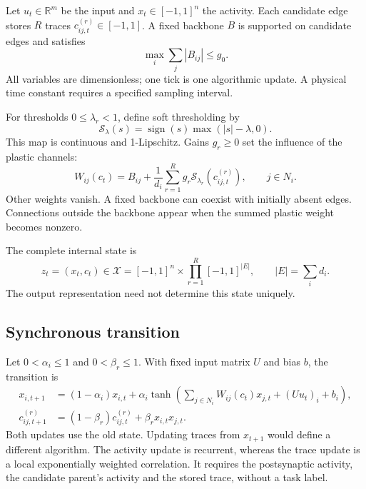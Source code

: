 \documentclass[11pt,a4paper]{article}
\theoremstyle{definition}\newtheorem{definition}[theorem]{Definition}
\newcommand{\R}{\mathbb{R}}
\newcommand{\soft}{\mathcal{S}}
\newcommand{\state}{\mathcal{X}}
\begin{document}
Let $u_t\in\R^m$ be the input and $x_t\in[-1,1]^n$ the activity. Each candidate edge stores $R$ traces $c^{(r)}_{ij,t}\in[-1,1]$. A fixed backbone $B$ is supported on candidate edges and satisfies
\begin{equation}
 \max_i\sum_j|B_{ij}|\leq g_0. \label{eq:backbone}
\end{equation}
All variables are dimensionless; one tick is one algorithmic update. A physical time constant requires a specified sampling interval.

For thresholds $0\leq\lambda_r<1$, define soft thresholding by
\begin{equation}
 \soft_{\lambda}(s)=\operatorname{sign}(s)\max(|s|-\lambda,0).
 \label{eq:soft}
\end{equation}
This map is continuous and 1-Lipschitz. Gains $g_r\geq0$ set the influence of the plastic channels:
\begin{equation}
 W_{ij}(c_t)=B_{ij}+\frac1{d_i}\sum_{r=1}^R g_r\soft_{\lambda_r}(c^{(r)}_{ij,t}),\qquad j\in N_i.
 \label{eq:weights}
\end{equation}
Other weights vanish. A fixed backbone can coexist with initially absent edges. Connections outside the backbone appear when the summed plastic weight becomes nonzero.

The complete internal state is
\begin{equation}
 z_t=(x_t,c_t)\in\state=[-1,1]^n\times\prod_{r=1}^R[-1,1]^{|E|},
 \qquad |E|=\sum_i d_i. \label{eq:state}
\end{equation}
The output representation need not determine this state uniquely.

\subsection{Synchronous transition}
Let $0<\alpha_i\leq1$ and $0<\beta_r\leq1$. With fixed input matrix $U$ and bias $b$, the transition is
\begin{align}
 x_{i,t+1}&=(1-\alpha_i)x_{i,t}+\alpha_i\tanh\!\left(\sum_{j\in N_i}W_{ij}(c_t)x_{j,t}+(Uu_t)_i+b_i\right), \label{eq:activity}\\
 c^{(r)}_{ij,t+1}&=(1-\beta_r)c^{(r)}_{ij,t}+\beta_r x_{i,t}x_{j,t}. \label{eq:trace}
\end{align}
Both updates use the old state. Updating traces from $x_{t+1}$ would define a different algorithm. The activity update is recurrent, whereas the trace update is a local exponentially weighted correlation. It requires the postsynaptic activity, the candidate parent's activity and the stored trace, without a task label.
\end{document}
